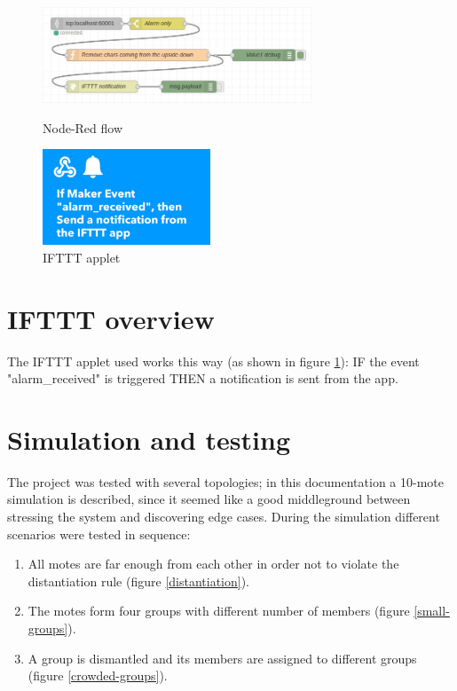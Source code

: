 \documentclass[11pt]{article}
\begin{document}
\begin{figure}[H]
  \begin{minipage}{0.6\textwidth}
    \includegraphics[height=108px]{Node-red-flow}
    \caption{Node-Red flow}
    \label{nodered}
  \end{minipage}
  \begin{minipage}{0.39\textwidth}
    \includegraphics[height=108px]{ifttt-screenshot}
    \caption{IFTTT applet}
    \label{ifttt}
  \end{minipage}
\end{figure}

\section{IFTTT overview}
The IFTTT applet used works this way (as shown in figure \ref{ifttt}): \newline
IF the event "alarm\_received" is triggered \newline
THEN a notification is sent from the app. \newline

\section{Simulation and testing}
The project was tested with several topologies; in this documentation a 10-mote simulation is described, since it seemed like a good middleground between stressing the system and discovering edge cases. \newline
During the simulation different scenarios were tested in sequence:
\begin{enumerate}
  \item All motes are far enough from each other in order not to violate the distantiation rule (figure \ref{distantiation}).
  \item The motes form four groups with different number of members (figure \ref{small-groups}).
  \item A group is dismantled and its members are assigned to different groups (figure \ref{crowded-groups}).
\end{enumerate}
\end{document}
